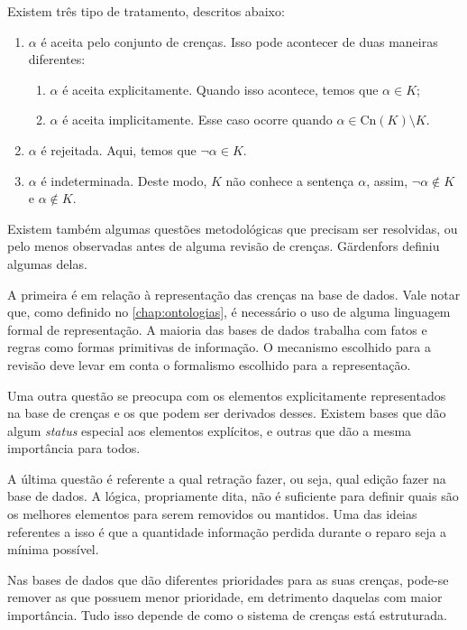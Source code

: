 Existem três tipo de tratamento, descritos abaixo:

\begin{enumerate}
	\item $ \alpha $ é aceita pelo conjunto de crenças. Isso pode acontecer de duas maneiras diferentes:
	\begin{enumerate}
		\item $ \alpha $ é aceita explicitamente. Quando isso acontece, temos que $ \alpha \in K $;
		\item $ \alpha $ é aceita implicitamente. Esse caso ocorre quando $ \alpha \in \text{Cn}(K) \setminus K $.
	\end{enumerate}
	\item $ \alpha $ é rejeitada. Aqui, temos que $ \lnot \alpha \in K $. 
	\item $ \alpha $ é indeterminada. Deste modo, $ K $ não conhece a sentença $ \alpha $, assim, $ \lnot \alpha \notin K $ e $ \alpha \notin K $.
\end{enumerate}

Existem também algumas questões metodológicas que precisam ser resolvidas, ou pelo menos observadas antes de alguma revisão de crenças. Gärdenfors \cite{revisaoGardenfors2} definiu algumas delas.

A primeira é em relação à representação das crenças na base de dados. Vale notar que, como definido no \autoref{chap:ontologias}, é necessário o uso de alguma linguagem formal de representação. A maioria das bases de dados trabalha com fatos e regras como formas primitivas de informação. O mecanismo escolhido para a revisão deve levar em conta o formalismo escolhido para a representação.

Uma outra questão se preocupa com os elementos explicitamente representados na base de crenças e os que podem ser derivados desses. Existem bases que dão algum \textit{status} especial aos elementos explícitos, e outras que dão a mesma importância para todos. 

A última questão é referente a qual retração fazer, ou seja, qual edição fazer na base de dados. A lógica, propriamente dita, não é suficiente para definir quais são os melhores elementos para serem removidos ou mantidos. Uma das ideias referentes a isso é que a quantidade informação perdida durante o reparo seja a mínima possível. 

Nas bases de dados que dão diferentes prioridades para as suas crenças, pode-se remover as que possuem menor prioridade, em detrimento daquelas com maior importância. Tudo isso depende de como o sistema de crenças está estruturada.

